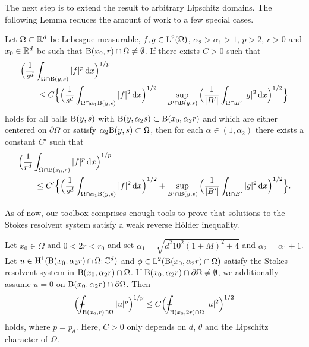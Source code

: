 The next step is to extend the result to arbitrary Lipschitz domains. The following Lemma reduces the amount of work to a few special cases.

\begin{lem}[Tolksdorf]
  \label{lem:ballsforballs}
  Let $\Omega \subset \mathbb{R}^d$ be Lebesgue-measurable, $f, g \in \mathrm{L}^2(\Omega)$, $\alpha_2 > \alpha_1 > 1$, $p > 2$, $r > 0$ and $x_0 \in \mathbb{R}^d$ be such that $\mathrm{B}(x_0, r) \cap \Omega \neq \emptyset$.
  If there exists $C > 0$ such that
  \begin{align*}
    &\Big( \frac{1}{s^d} \int_{\Omega \cap \mathrm{B}(y, s)} |f|^p \, {\operatorname{d}\!{x}} \Big)^{1/p} \\
    &\qquad\leq C \Big\{ \Big( \frac{1}{s^d} \int_{\Omega \cap \alpha_1 \mathrm{B}(y, s)} |f|^2 \, {\operatorname{d}\!{x}} \Big)^{1/2} + \sup_{B' \cap \mathrm{B}(y,s)} \Big( \frac{1}{|B'|} \int_{\Omega \cap B'} |g|^2 \, {\operatorname{d}\!{x}} \Big)^{1/2} \Big\}
  \end{align*}
  holds for all balls $\mathrm{B}(y,s)$ with $\mathrm{B}(y,\alpha_2 s) \subset \mathrm{B}(x_0, \alpha_2 r)$ and which are either centered on $\partial\Omega$ or satisfy $\alpha_2 \mathrm{B}(y,s) \subset \Omega$, then for each $\alpha \in (1,\alpha_2)$ there exists a constant $C'$ such that
  \begin{align*}
    &\Big( \frac{1}{r^d} \int_{\Omega \cap \mathrm{B}(x_0, r)} |f|^p \, {\operatorname{d}\!{x}} \Big)^{1/p} 
    \\
    &\qquad\leq C' \Big\{ \Big( \frac{1}{s^d} \int_{\Omega \cap \alpha_1 \mathrm{B}(y, s)} |f|^2 \, {\operatorname{d}\!{x}} \Big)^{1/2} + \sup_{B' \cap \mathrm{B}(y,s)} \Big( \frac{1}{|B'|} \int_{\Omega \cap B'} |g|^2 \, {\operatorname{d}\!{x}} \Big)^{1/2} \Big\}.
  \end{align*}
\end{lem}

As of now, our toolbox comprises enough tools to prove that solutions to the Stokes resolvent system satisfy a weak reverse H\"older inequality.

\begin{lem}
  \label{lem:reverseHoelder}
  Let $x_0 \in \overline\Omega$ and $0 < 2r < r_0$ and set $\alpha_1 = \sqrt{d^2 10^2 (1 + M)^2 + 4}$ and $\alpha_2 = \alpha_1 + 1$.
  Let $u \in \mathrm{H}^1(\mathrm{B}(x_0,  \alpha_2 r) \cap \Omega; \mathbb{C}^d)$ and $\phi \in \mathrm{L}^2(\mathrm{B}(x_0, \alpha_2 r) \cap \Omega)$ satisfy the Stokes resolvent system in $\mathrm{B}(x_0, \alpha_2 r) \cap \Omega$. 
  If $\mathrm{B}(x_0, \alpha_2 r) \cap \partial \Omega \neq \emptyset $, we additionally assume $u = 0$ on $\mathrm{B}(x_0, \alpha_2 r) \cap \partial\Omega$.
  Then
  \begin{align}
    \label{eq:reverseHoelder}
    \Big( \dashint_{\BB(x_0, r) \cap \Omega} |u|^p \Big)^{1/p} \leq C \Big( \dashint_{\BB(x_0, 2 r) \cap \Omega} |u|^2 \Big)^{1/2}
  \end{align}
  holds, where $p = p_d$.
  Here, $C > 0$ only depends on $d$, $\theta$ and the Lipschitz character of $\Omega$.
\end{lem}

